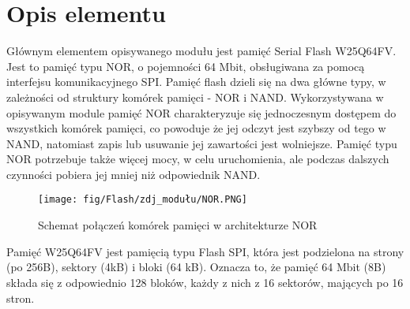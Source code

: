 \documentclass[11pt, a4paper]{article}
\institute{Instytut Robotyki i Inteligencji Maszynowej}
\begin{document}
\newpage

\section{Opis elementu} 
Głównym elementem opisywanego modułu jest pamięć Serial Flash W25Q64FV. Jest to pamięć typu NOR, o pojemności 64 Mbit, obsługiwana za pomocą interfejsu komunikacyjnego SPI. Pamięć flash dzieli się na dwa główne typy, w zależności od struktury komórek pamięci - NOR i NAND. Wykorzystywana w opisywanym module pamięć NOR charakteryzuje się jednoczesnym dostępem do wszystkich komórek pamięci, co powoduje że jej odczyt jest szybszy od tego w NAND, natomiast zapis lub usuwanie jej zawartości jest wolniejsze. Pamięć typu NOR potrzebuje także więcej mocy, w celu uruchomienia, ale podczas dalszych czynności pobiera jej mniej niż odpowiednik NAND.
\vspace{0.3cm}
\begin{figure}[H]
\centering
\texttt{[image: fig/Flash/zdj\_modułu/NOR.PNG]}
\caption{Schemat połączeń komórek pamięci w architekturze NOR}
\label{fig:sub3}
\end{figure}
\vspace{0.3cm}
Pamięć W25Q64FV jest pamięcią typu Flash SPI, która jest podzielona na strony (po 256B), sektory (4kB) i bloki (64 kB). Oznacza to, że pamięć 64 Mbit (8B) składa się z odpowiednio 128 bloków, każdy z nich z 16 sektorów, mających po 16 stron. %
\end{document}

